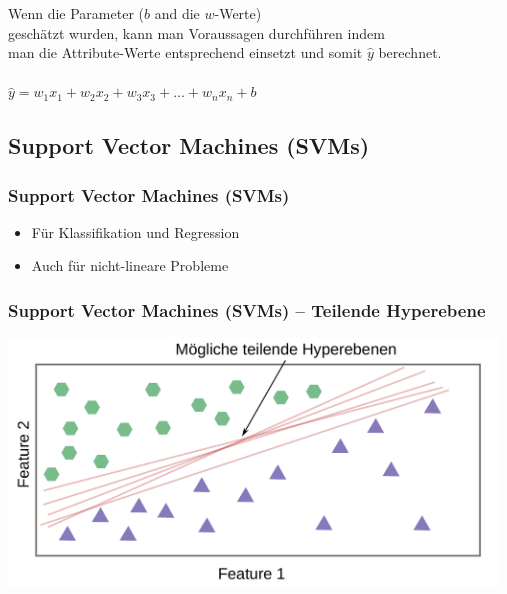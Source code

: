 \documentclass[aspectratio=169]{beamer}
\begin{document}
\begin{frame}
  \frametitle{}
  \begin{block}{}
    \begin{center}
      Wenn die Parameter ($b$ and die $w$-Werte) \\
      geschätzt wurden, kann man Voraussagen durchführen indem\\ man
      die Attribute-Werte entsprechend einsetzt und somit $\hat{y}$
      berechnet. \\ \ \\
      $\hat{y} = w_{1}x_{1} + w_{2}x_{2} + w_{3}x_{3} + ... + w_{n}x_{n} + b$\\
    \end{center}
  \end{block}
\end{frame}

\subsection{Support Vector Machines (SVMs)}

\setcounter{tocdepth}{2}
\begin{frame}{}
   \tableofcontents[currentsubsection,hideothersubsections,
     subsectionstyle=show/shaded]
\end{frame}

\begin{frame}
  \frametitle{Support Vector Machines (SVMs)}  
  \begin{block}{}
    \begin{itemize}
    \item Für Klassifikation und Regression
    \item Auch für nicht-lineare Probleme
    \end{itemize}
  \end{block}
\end{frame}

\begin{frame}
  \frametitle{Support Vector Machines (SVMs) -- Teilende Hyperebene}
  \begin{center}
    \includegraphics[width=13.0cm]{images/svm_potential_separating_hyperplanes.pdf}
  \end{center}
\end{frame}
\end{document}
